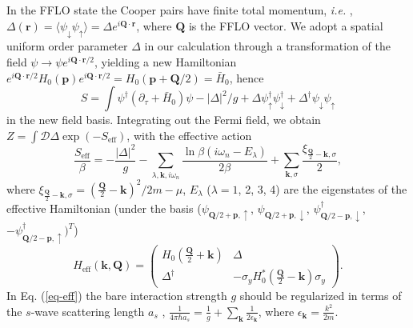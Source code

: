 \documentclass[prl,showpacs,twocolumn]{revtex4}
\begin{document}
In the FFLO state the Cooper pairs have finite total momentum, \textit{i.e.}%
, $\Delta (\mathbf{r})=\langle \psi _{\downarrow }\psi _{\uparrow }\rangle
=\Delta e^{i\mathbf{Q}\cdot \mathbf{r}}$, where $\mathbf{Q}$ is the FFLO
vector. We adopt a spatial uniform order parameter $\Delta $ in our
calculation through a transformation of the field $\psi \rightarrow \psi e^{i%
\mathbf{Q}\cdot \mathbf{r}/2}$, yielding a new Hamiltonian $e^{i\mathbf{Q}%
\cdot \mathbf{r}/2}H_{0}(\mathbf{p})e^{i\mathbf{Q}\cdot \mathbf{r}/2}=H_{0}(%
\mathbf{p}+\mathbf{Q}/2)=\bar{H}_{0}$, hence%
\begin{equation}
S=\int \psi ^{\dagger }(\partial _{\tau }+\bar{H}_{0})\psi -|\Delta
|^{2}/g+\Delta \psi _{\uparrow }^{\dagger }\psi _{\downarrow }^{\dagger
}+\Delta ^{\dagger }\psi _{\downarrow }\psi _{\uparrow }  \label{eq-S1}
\end{equation}%
in the new field basis. Integrating out the Fermi field, we obtain $Z=\int
\mathcal{D}\Delta \exp (-S_{\text{eff}})$, with the effective action
\begin{equation}
{\frac{S_{\text{eff}}}{\beta }}=-{\frac{|\Delta |^{2}}{g}}-\sum_{\lambda ,%
\mathbf{k},i\omega _{n}}{\frac{\ln \beta (i\omega _{n}-E_{\lambda })}{2\beta
}}+\sum_{\mathbf{k},\sigma }{\frac{\xi _{{\frac{\mathbf{Q}}{2}}-\mathbf{k}%
,\sigma }}{2}},  \label{eq-eff}
\end{equation}%
where $\xi _{{\frac{\mathbf{Q}}{2}}-\mathbf{k},\sigma }=({\frac{\mathbf{Q}}{2%
}}-\mathbf{k})^{2}/2m-\mu $, $E_{\lambda }$ ($\lambda =1$, 2, 3, 4) are the
eigenstates of the effective Hamiltonian (under the basis ($\psi _{\mathbf{Q}%
/2+\mathbf{p},\uparrow }$, $\psi _{\mathbf{Q}/2+\mathbf{p},\downarrow }$, $%
\psi _{\mathbf{Q}/2-\mathbf{p},\downarrow }^{\dagger }$, $-\psi _{\mathbf{Q}%
/2-\mathbf{p},\uparrow }^{\dagger })^{T}$)
\begin{equation}
H_{\text{eff}}(\mathbf{k},\mathbf{Q})=%
\begin{pmatrix}
H_{0}({\frac{\mathbf{Q}}{2}}+\mathbf{k}) & \Delta \\
\Delta ^{\dagger } & -\sigma _{y}H_{0}^{\ast }({\frac{\mathbf{Q}}{2}}-%
\mathbf{k})\sigma _{y}%
\end{pmatrix}%
.
\end{equation}%
In Eq. (\ref{eq-eff}) the bare interaction strength $g$ should be
regularized in terms of the $s$-wave scattering length $a_{s}$ \cite{Gong11,
Iskin}, ${\frac{1}{4\pi \hbar a_{s}}}={\frac{1}{g}}+\sum_{\mathbf{k}}{\frac{1%
}{2\epsilon _{\mathbf{k}}}}$, where $\epsilon _{\mathbf{k}}={\frac{k^{2}}{2m}%
}$.
\end{document}

